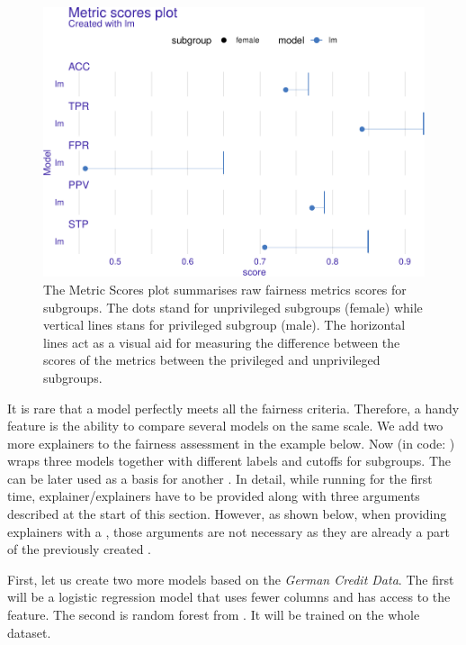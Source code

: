 \begin{figure}
{\centering \includegraphics[width=0.75\linewidth]{Wisniewski-Biecek_files/figure-latex/fairness-plot-2-1} 

}

\caption[The Metric Scores plot summarises raw fairness metrics scores for subgroups]{The Metric Scores plot summarises raw fairness metrics scores for subgroups. The dots stand for unprivileged subgroups (female) while vertical lines stans for privileged subgroup (male). The horizontal lines act as a visual aid for measuring the difference between the scores of the metrics between the privileged and unprivileged subgroups.}\label{fig:fairness-plot-2}
\end{figure}


It is rare that a model perfectly meets all the fairness criteria.
Therefore, a handy feature is the ability to compare several models on
the same scale. We add two more explainers to the fairness assessment in
the example below. Now  (in code:
) wraps three models together with different labels and
cutoffs for subgroups. The  can be later used
as a basis for another . In detail, while
running  for the first time,
explainer/explainers have to be provided along with three arguments
described at the start of this section. However, as shown below, when
providing explainers with a , those arguments
are not necessary as they are already a part of the previously created
.

First, let us create two more models based on the \emph{German Credit
Data}. The first will be a logistic regression model that uses fewer
columns and has access to the  feature. The second is random
forest from  \citep{ranger}. It will be trained on the
whole dataset.

